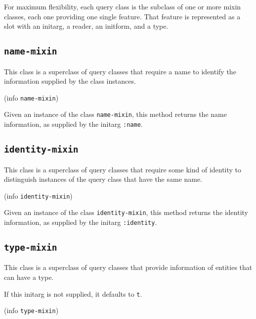 For maximum flexibility, each query class is the subclass of one or
more mixin classes, each one providing one single feature.  That
feature is represented as a slot with an initarg, a reader, an
initform, and a type.

\subsection{\texttt{name-mixin}}
\label{sec-name-mixin}


This class is a superclass of query classes that require a name to
identify the information supplied by the class instances.


 {(info {\tt name-mixin})}

Given an instance of the class \texttt{name-mixin}, this method
returns the name information, as supplied by the initarg
\texttt{:name}.

\subsection{\texttt{identity-mixin}}
\label{sec-identity-mixin}


This class is a superclass of query classes that require some kind of
identity to distinguish instances of the query class that have the
same name.


 {(info {\tt identity-mixin})}

Given an instance of the class \texttt{identity-mixin}, this method
returns the identity information, as supplied by the initarg
\texttt{:identity}.

\subsection{\texttt{type-mixin}}
\label{sec-type-mixin}


This class is a superclass of query classes that provide information
of entities that can have a type.


If this initarg is not supplied, it defaults to \texttt{t}.

 {(info {\tt type-mixin})}

